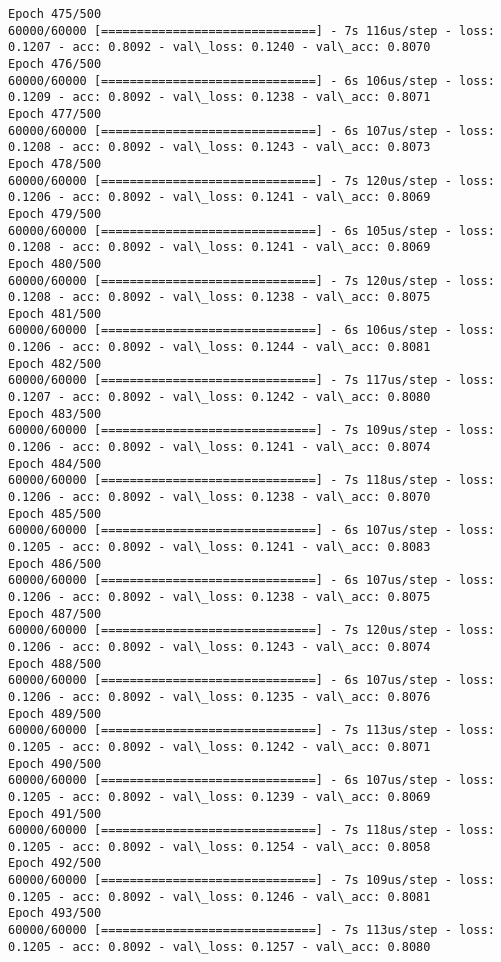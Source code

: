 \documentclass[11pt]{article}
\begin{document}
\begin{Verbatim}[commandchars=\\\{\}]
Epoch 475/500
60000/60000 [==============================] - 7s 116us/step - loss: 0.1207 - acc: 0.8092 - val\_loss: 0.1240 - val\_acc: 0.8070
Epoch 476/500
60000/60000 [==============================] - 6s 106us/step - loss: 0.1209 - acc: 0.8092 - val\_loss: 0.1238 - val\_acc: 0.8071
Epoch 477/500
60000/60000 [==============================] - 6s 107us/step - loss: 0.1208 - acc: 0.8092 - val\_loss: 0.1243 - val\_acc: 0.8073
Epoch 478/500
60000/60000 [==============================] - 7s 120us/step - loss: 0.1206 - acc: 0.8092 - val\_loss: 0.1241 - val\_acc: 0.8069
Epoch 479/500
60000/60000 [==============================] - 6s 105us/step - loss: 0.1208 - acc: 0.8092 - val\_loss: 0.1241 - val\_acc: 0.8069
Epoch 480/500
60000/60000 [==============================] - 7s 120us/step - loss: 0.1208 - acc: 0.8092 - val\_loss: 0.1238 - val\_acc: 0.8075
Epoch 481/500
60000/60000 [==============================] - 6s 106us/step - loss: 0.1206 - acc: 0.8092 - val\_loss: 0.1244 - val\_acc: 0.8081
Epoch 482/500
60000/60000 [==============================] - 7s 117us/step - loss: 0.1207 - acc: 0.8092 - val\_loss: 0.1242 - val\_acc: 0.8080
Epoch 483/500
60000/60000 [==============================] - 7s 109us/step - loss: 0.1206 - acc: 0.8092 - val\_loss: 0.1241 - val\_acc: 0.8074
Epoch 484/500
60000/60000 [==============================] - 7s 118us/step - loss: 0.1206 - acc: 0.8092 - val\_loss: 0.1238 - val\_acc: 0.8070
Epoch 485/500
60000/60000 [==============================] - 6s 107us/step - loss: 0.1205 - acc: 0.8092 - val\_loss: 0.1241 - val\_acc: 0.8083
Epoch 486/500
60000/60000 [==============================] - 6s 107us/step - loss: 0.1206 - acc: 0.8092 - val\_loss: 0.1238 - val\_acc: 0.8075
Epoch 487/500
60000/60000 [==============================] - 7s 120us/step - loss: 0.1206 - acc: 0.8092 - val\_loss: 0.1243 - val\_acc: 0.8074
Epoch 488/500
60000/60000 [==============================] - 6s 107us/step - loss: 0.1206 - acc: 0.8092 - val\_loss: 0.1235 - val\_acc: 0.8076
Epoch 489/500
60000/60000 [==============================] - 7s 113us/step - loss: 0.1205 - acc: 0.8092 - val\_loss: 0.1242 - val\_acc: 0.8071
Epoch 490/500
60000/60000 [==============================] - 6s 107us/step - loss: 0.1205 - acc: 0.8092 - val\_loss: 0.1239 - val\_acc: 0.8069
Epoch 491/500
60000/60000 [==============================] - 7s 118us/step - loss: 0.1205 - acc: 0.8092 - val\_loss: 0.1254 - val\_acc: 0.8058
Epoch 492/500
60000/60000 [==============================] - 7s 109us/step - loss: 0.1205 - acc: 0.8092 - val\_loss: 0.1246 - val\_acc: 0.8081
Epoch 493/500
60000/60000 [==============================] - 7s 113us/step - loss: 0.1205 - acc: 0.8092 - val\_loss: 0.1257 - val\_acc: 0.8080

\end{Verbatim}
\end{document}
